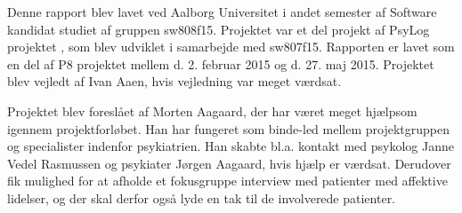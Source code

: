 Denne rapport blev lavet ved Aalborg Universitet i andet semester af Software kandidat studiet af gruppen sw808f15.
Projektet var et del projekt af PsyLog projektet \citep{misc:faellesrapp}, som blev udviklet i samarbejde med sw807f15.
Rapporten er lavet som en del af P8 projektet mellem d. 2. februar 2015 og d. 27. maj 2015.
Projektet blev vejledt af Ivan Aaen, hvis vejledning var meget værdsat.

Projektet blev foreslået af Morten Aagaard, der har været meget hjælpsom igennem projektforløbet.
Han har fungeret som binde-led mellem projektgruppen og specialister indenfor psykiatrien. 
Han skabte bl.a. kontakt med psykolog Janne Vedel Rasmussen og psykiater Jørgen Aagaard, hvis hjælp er værdsat.
Derudover fik mulighed for at afholde et fokusgruppe interview med patienter med affektive lidelser, og der skal derfor også lyde en tak til de involverede patienter.